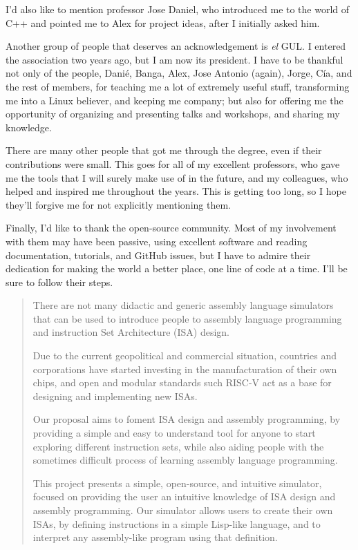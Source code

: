 \documentclass[en]{uc3mthesisIEEE}
\begin{document}
\begin{acknowledgements}
    I'd also like to mention professor Jose Daniel, who introduced me to the world of C++ and pointed me to Alex for project ideas, after I initially asked him.

    Another group of people that deserves an acknowledgement is \textit{el} GUL. I entered the association two years ago, but I am now its president. I have to be thankful not only of the people, Danié, Banga, Alex, Jose Antonio (again), Jorge, Cía, and the rest of members, for teaching me a lot of extremely useful stuff, transforming me into a Linux believer, and keeping me company; but also for offering me the opportunity of organizing and presenting talks and workshops, and sharing my knowledge.

    There are many other people that got me through the degree, even if their contributions were small. This goes for all of my excellent professors, who gave me the tools that I will surely make use of in the future, and my colleagues, who helped and inspired me throughout the years. This is getting too long, so I hope they'll forgive me for not explicitly mentioning them.

    Finally, I'd like to thank the open-source community. Most of my involvement with them may have been passive, using excellent software and reading documentation, tutorials, and GitHub issues, but I have to admire their dedication for making the world a better place, one line of code at a time. I'll be sure to follow their steps.
  \end{acknowledgements}


  \begin{abstract}
    There are not many didactic and generic assembly language simulators that can be used to introduce people to assembly language programming and instruction Set Architecture (ISA) design.

    Due to the current geopolitical and commercial situation, countries and corporations have started investing in the manufacturation of their own chips, and open and modular standards such RISC-V act as a base for designing and implementing new ISAs.

    Our proposal aims to foment ISA design and assembly programming, by providing a simple and easy to understand tool for anyone to start exploring different instruction sets, while also aiding people with the sometimes difficult process of learning assembly language programming.

    This project presents a simple, open-source, and intuitive simulator, focused on providing the user an intuitive knowledge of ISA design and assembly programming. Our simulator allows users to create their own ISAs, by defining instructions in a simple Lisp-like language, and to interpret any assembly-like program using that definition.

  \end{abstract}
\end{document}
